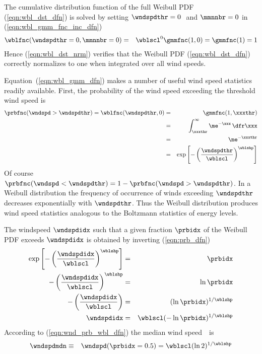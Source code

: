 \documentclass[12pt,twoside]{book}
\begin{document}
The cumulative distribution function of the full Weibull PDF
(\ref{eqn:wbl_dst_dfn}) is solved by setting $\wndspdthr = 0$\,\mxs\
and $\mmnnbr = 0$ in (\ref{eqn:wbl_gmm_fnc_inc_dfn})  
\begin{eqnarray}
\wblfnc(\wndspdthr = 0,\mmnnbr = 0) & = &
\wblscl^{0} \gmmfnc (1,0) = \gmmfnc(1) = 1
\label{eqn:wbl_dst_nrm}
\end{eqnarray}
Hence (\ref{eqn:wbl_dst_nrm}) verifies that the Weibull PDF
(\ref{eqn:wbl_dst_dfn}) correctly normalizes to one when integrated
over all wind speeds.

Equation~(\ref{eqn:wbl_gmm_dfn}) makes a number of useful wind speed
statistics readily available.
First, the probability of the wind speed exceeding the threshold wind
speed is
\begin{eqnarray}
\prbfnc(\wndspd > \wndspdthr) = \wblfnc(\wndspdthr,0) 
& = & \gmmfnc (1, \xxxthr) \nonumber \\
& = & \int_{\xxxthr}^{\infty} \me^{-\xxx} \,\dfr \xxx \nonumber \\
& = & \me^{-\xxxthr} \nonumber \\
& = & \exp \left[- \left( \frac{\wndspdthr}{\wblscl} \right)^{\wblshp} \right]
\label{eqn:prb_dfn}
\end{eqnarray}
Of course 
$\prbfnc(\wndspd < \wndspdthr) = 1 - \prbfnc(\wndspd > \wndspdthr)$.
In a Weibull distribution the frequency of occurrence of winds
exceeding $\wndspdthr$ decreases exponentially with $\wndspdthr$.
Thus the Weibull distribution produces wind speed statistics analogous
to the Boltzmann statistics of energy levels.

The windspeed $\wndspdidx$ such that a given fraction $\prbidx$ of
the Weibull PDF exceeds $\wndspdidx$ is obtained by inverting
(\ref{eqn:prb_dfn})
\begin{eqnarray}
\exp \left[- \left( \frac{\wndspdidx}{\wblscl} \right)^{\wblshp} \right] & = & \prbidx \nonumber \\
- \left( \frac{\wndspdidx}{\wblscl} \right)^{\wblshp} & = & \ln \prbidx \nonumber \\
- \left( \frac{\wndspdidx}{\wblscl} \right) & = & (\ln \prbidx)^{1/\wblshp} \nonumber \\
\wndspdidx & = & \wblscl (-\ln \prbidx)^{1/\wblshp}
\label{eqn:wnd_prb_wbl_dfn}
\end{eqnarray}
According to (\ref{eqn:wnd_prb_wbl_dfn}) the median wind speed~\wndspdmdn\ is 
\begin{eqnarray}
\wndspdmdn & \equiv & \wndspd(\prbidx = 0.5) = \wblscl (\ln 2)^{1/\wblshp}
\label{eqn:wnd_mdn_wbl_dfn}
\end{eqnarray}
\end{document}

